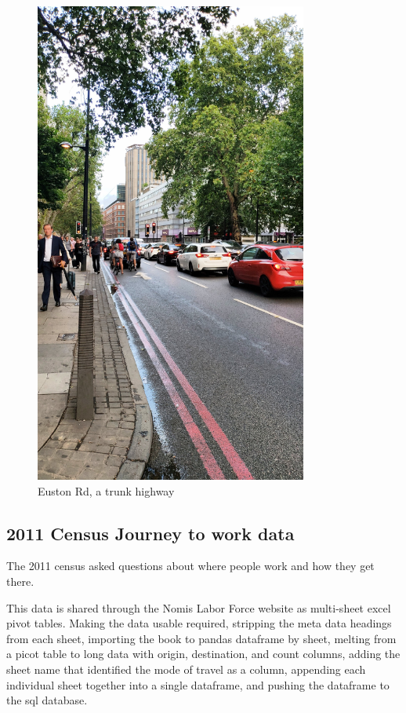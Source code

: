 \documentclass[11pt]{article} %
\begin{document}
\begin{figure}
\centering
\includegraphics[width=0.8\textwidth]{euston_rd}
\caption{Euston Rd, a trunk highway}
\end{figure}

\subsection{2011 Census Journey to work data}


The 2011 census asked questions about where people work and how they get there. 

This data is shared through the Nomis Labor Force website as multi-sheet excel pivot tables. Making the data usable required, stripping the meta data headings from each sheet, importing the book to pandas dataframe by sheet, melting from a picot table to long data with origin, destination, and count columns, adding the sheet name that identified the mode of travel as a column, appending each individual sheet together into a single dataframe, and pushing the dataframe to the sql database. 
\end{document}
